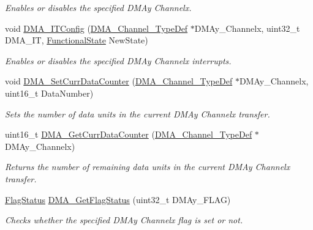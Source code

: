 \begin{DoxyCompactItemize}
\begin{DoxyCompactList}\small\item\em Enables or disables the specified D\+M\+Ay Channelx. \end{DoxyCompactList}\item 
void \mbox{\hyperlink{group___d_m_a___exported___functions_ga0bb60360be9cd57f96399be2f3b5eb2b}{D\+M\+A\+\_\+\+I\+T\+Config}} (\mbox{\hyperlink{struct_d_m_a___channel___type_def}{D\+M\+A\+\_\+\+Channel\+\_\+\+Type\+Def}} $\ast$D\+M\+Ay\+\_\+\+Channelx, uint32\+\_\+t D\+M\+A\+\_\+\+IT, \mbox{\hyperlink{group___exported__types_gac9a7e9a35d2513ec15c3b537aaa4fba1}{Functional\+State}} New\+State)
\begin{DoxyCompactList}\small\item\em Enables or disables the specified D\+M\+Ay Channelx interrupts. \end{DoxyCompactList}\item 
void \mbox{\hyperlink{group___d_m_a___exported___functions_gade5d9e532814eaa46514cb385fdff709}{D\+M\+A\+\_\+\+Set\+Curr\+Data\+Counter}} (\mbox{\hyperlink{struct_d_m_a___channel___type_def}{D\+M\+A\+\_\+\+Channel\+\_\+\+Type\+Def}} $\ast$D\+M\+Ay\+\_\+\+Channelx, uint16\+\_\+t Data\+Number)
\begin{DoxyCompactList}\small\item\em Sets the number of data units in the current D\+M\+Ay Channelx transfer. \end{DoxyCompactList}\item 
uint16\+\_\+t \mbox{\hyperlink{group___d_m_a___exported___functions_ga511b4c402d1ff32d53f28736956cac5d}{D\+M\+A\+\_\+\+Get\+Curr\+Data\+Counter}} (\mbox{\hyperlink{struct_d_m_a___channel___type_def}{D\+M\+A\+\_\+\+Channel\+\_\+\+Type\+Def}} $\ast$D\+M\+Ay\+\_\+\+Channelx)
\begin{DoxyCompactList}\small\item\em Returns the number of remaining data units in the current D\+M\+Ay Channelx transfer. \end{DoxyCompactList}\item 
\mbox{\hyperlink{group___exported__types_ga89136caac2e14c55151f527ac02daaff}{Flag\+Status}} \mbox{\hyperlink{group___d_m_a___exported___functions_gafb30b7a891834c267eefd5d30b688a9f}{D\+M\+A\+\_\+\+Get\+Flag\+Status}} (uint32\+\_\+t D\+M\+Ay\+\_\+\+F\+L\+AG)
\begin{DoxyCompactList}\small\item\em Checks whether the specified D\+M\+Ay Channelx flag is set or not. \end{DoxyCompactList}\item 

\end{DoxyCompactItemize}
